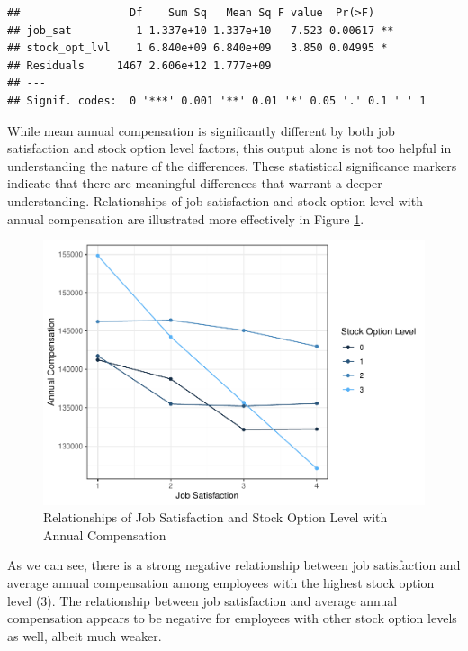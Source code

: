 \documentclass[
]{book}
\begin{document}
\begin{verbatim}
##                 Df    Sum Sq   Mean Sq F value  Pr(>F)   
## job_sat          1 1.337e+10 1.337e+10   7.523 0.00617 **
## stock_opt_lvl    1 6.840e+09 6.840e+09   3.850 0.04995 * 
## Residuals     1467 2.606e+12 1.777e+09                   
## ---
## Signif. codes:  0 '***' 0.001 '**' 0.01 '*' 0.05 '.' 0.1 ' ' 1
\end{verbatim}

While mean annual compensation is significantly different by both job satisfaction and stock option level factors, this output alone is not too helpful in understanding the nature of the differences. These statistical significance markers indicate that there are meaningful differences that warrant a deeper understanding. Relationships of job satisfaction and stock option level with annual compensation are illustrated more effectively in Figure \ref{fig:two-way-factorial}.

\begin{figure}

{\centering \includegraphics[width=1\linewidth]{People_Analytics_Lifecycle_files/figure-latex/two-way-factorial-1} 

}

\caption{Relationships of Job Satisfaction and Stock Option Level with Annual Compensation}\label{fig:two-way-factorial}
\end{figure}

As we can see, there is a strong negative relationship between job satisfaction and average annual compensation among employees with the highest stock option level (3). The relationship between job satisfaction and average annual compensation appears to be negative for employees with other stock option levels as well, albeit much weaker.
\end{document}
